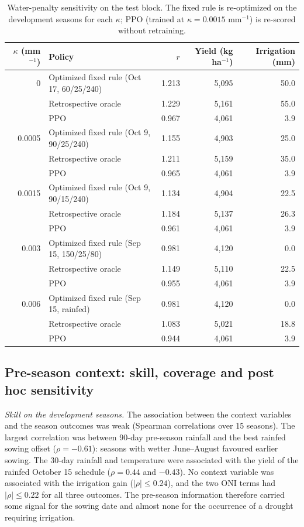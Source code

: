 \documentclass[times,final,authoryear]{elsarticle}
\begin{document}
\begin{table}[!h]
\centering
\scriptsize
\caption{Water-penalty sensitivity on the test block. The fixed rule is re-optimized on the development seasons for each $\kappa$; PPO (trained at $\kappa = 0.0015$ mm$^{-1}$) is re-scored without retraining.}
\label{tab_kappa}
\begin{tabular}{rlrrr}
\hline
$\kappa$ (mm$^{-1}$) & Policy & $r$ & Yield (kg ha$^{-1}$) & Irrigation (mm) \\
\hline
0      & Optimized fixed rule (Oct 17, 60/25/240) & 1.213 & 5,095 & 50.0 \\
       & Retrospective oracle & 1.229 & 5,161 & 55.0 \\
       & PPO & 0.967 & 4,061 & 3.9 \\
0.0005 & Optimized fixed rule (Oct 9, 90/25/240) & 1.155 & 4,903 & 25.0 \\
       & Retrospective oracle & 1.211 & 5,159 & 35.0 \\
       & PPO & 0.965 & 4,061 & 3.9 \\
0.0015 & Optimized fixed rule (Oct 9, 90/15/240) & 1.134 & 4,904 & 22.5 \\
       & Retrospective oracle & 1.184 & 5,137 & 26.3 \\
       & PPO & 0.961 & 4,061 & 3.9 \\
0.003  & Optimized fixed rule (Sep 15, 150/25/80) & 0.981 & 4,120 & 0.0 \\
       & Retrospective oracle & 1.149 & 5,110 & 22.5 \\
       & PPO & 0.955 & 4,061 & 3.9 \\
0.006  & Optimized fixed rule (Sep 15, rainfed) & 0.981 & 4,120 & 0.0 \\
       & Retrospective oracle & 1.083 & 5,021 & 18.8 \\
       & PPO & 0.944 & 4,061 & 3.9 \\
\hline
\end{tabular}
\end{table}

\subsection{Pre-season context: skill, coverage and post hoc sensitivity}
\label{subres_context}

\emph{Skill on the development seasons.} The association between the context variables and the season outcomes was weak (Spearman correlations over 15 seasons). The largest correlation was between 90-day pre-season rainfall and the best rainfed sowing offset ($\rho = -0.61$): seasons with wetter June--August favoured earlier sowing. The 30-day rainfall and temperature were associated with the yield of the rainfed October 15 schedule ($\rho = 0.44$ and $-0.43$). No context variable was associated with the irrigation gain ($|\rho| \leq 0.24$), and the two ONI terms had $|\rho| \leq 0.22$ for all three outcomes. The pre-season information therefore carried some signal for the sowing date and almost none for the occurrence of a drought requiring irrigation.
\end{document}
